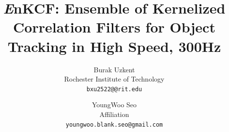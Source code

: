 \documentclass[10pt,twocolumn,letterpaper]{article}
\newcounter{ct}
\begin{document}
\title{ {\it E}nKCF: Ensemble of Kernelized Correlation Filters for Object Tracking in High Speed, 300Hz}

\author{Burak Uzkent\\
Rochester Institute of Technology\\
{\tt\small bxu2522@@rit.edu}
\and
YoungWoo Seo\\
Affiliation\\
{\tt\small youngwoo.blank.seo@gmail.com}
}

\maketitle
\end{document}
